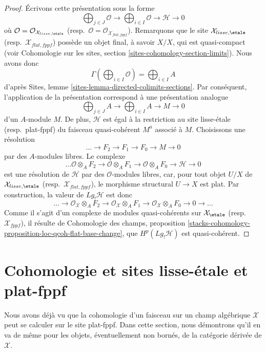 \begin{proof}
\medskip\noindent
Écrivons cette présentation sous la forme
$$
\bigoplus\nolimits_{j \in J} \mathcal{O} \longrightarrow
\bigoplus\nolimits_{i \in I} \mathcal{O} \longrightarrow
\mathcal{H} \longrightarrow 0
$$
où $\mathcal{O} = \mathcal{O}_{\mathcal{X}_{lisse,\etale}}$ (resp.\
$\mathcal{O} = \mathcal{O}_{\mathcal{X}_{flat,fppf}}$). Remarquons que le site
$\mathcal{X}_{lisse,\etale}$ (resp.\ $\mathcal{X}_{flat,fppf}$) possède un
objet final, à savoir $X/X$, qui est quasi-compact (voir Cohomologie sur les
sites, section \ref{sites-cohomology-section-limits}). Nous avons donc
$$
\Gamma(\bigoplus\nolimits_{i \in I} \mathcal{O}) =
\bigoplus\nolimits_{i \in I} A
$$
d'après Sites, lemme \ref{sites-lemma-directed-colimits-sections}. Par
conséquent, l'application de la présentation correspond à une présentation
analogue
$$
\bigoplus\nolimits_{j \in J} A \longrightarrow
\bigoplus\nolimits_{i \in I} A \longrightarrow
M \longrightarrow 0
$$
d'un $A$-module $M$. De plus, $\mathcal{H}$ est égal à la restriction au site
lisse-\'etale (resp.\ plat-fppf) du faisceau quasi-cohérent $M^a$ associé à
$M$. Choisissons une résolution
$$
\ldots \to F_2 \to F_1 \to F_0 \to M \to 0
$$
par des $A$-modules libres. Le complexe
$$
\ldots \mathcal{O} \otimes_A F_2 \to \mathcal{O} \otimes_A F_1 \to
\mathcal{O} \otimes_A F_0 \to \mathcal{H} \to 0
$$
est une résolution de $\mathcal{H}$ par des $\mathcal{O}$-modules libres, car,
pour tout objet $U/X$ de $\mathcal{X}_{lisse,\etale}$ (resp.\
$\mathcal{X}_{flat,fppf}$), le morphisme structural $U \to X$ est plat. Par
construction, la valeur de $Lg_!\mathcal{H}$ est donc
$$
\ldots \to
\mathcal{O}_\mathcal{X} \otimes_A F_2 \to
\mathcal{O}_\mathcal{X} \otimes_A F_1 \to
\mathcal{O}_\mathcal{X} \otimes_A F_0 \to 0 \to \ldots
$$
Comme il s'agit d'un complexe de modules quasi-cohérents sur
$\mathcal{X}_\etale$ (resp.\ $\mathcal{X}_{fppf}$), il résulte de Cohomologie
des champs, proposition
\ref{stacks-cohomology-proposition-loc-qcoh-flat-base-change}, que
$H^p(Lg_!\mathcal{H})$ est quasi-cohérent.
\end{proof}




\section{Cohomologie et sites lisse-\'etale et plat-fppf}
\label{section-compare-unbounded-lisse-etale}

\noindent
Nous avons déjà vu que la cohomologie d'un faisceau sur un champ algébrique
$\mathcal{X}$ peut se calculer sur le site plat-fppf. Dans cette section, nous
démontrons qu'il en va de même pour les objets, éventuellement non bornés, de
la catégorie dérivée de $\mathcal{X}$.

